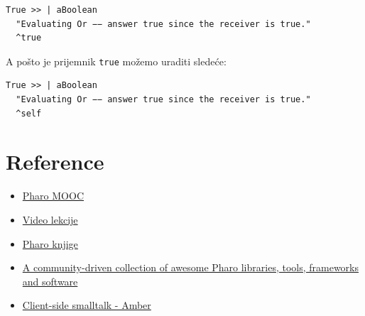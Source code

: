 \documentclass[presentation]{beamer}
\begin{document}
\begin{verbatim}
True >> | aBoolean
  "Evaluating Or −− answer true since the receiver is true."
  ^true
\end{verbatim}

A pošto je prijemnik \texttt{true} možemo uraditi sledeće:

\begin{verbatim}
True >> | aBoolean
  "Evaluating Or −− answer true since the receiver is true."
  ^self
\end{verbatim}

\section{Reference}
\label{sec:org6471919}

\begin{itemize}
\item \href{http://mooc.pharo.org}{Pharo MOOC}
\item \href{http://rmod-pharo-mooc.lille.inria.fr/MOOC/WebPortal/co/pharo.html}{Video lekcije}
\item \href{http://books.pharo.org}{Pharo knjige}
\item \href{https://github.com/pharo-open-documentation/awesome-pharo}{A community-driven collection of awesome Pharo libraries, tools, frameworks and software}
\item \href{http://amber-lang.net/}{Client-side smalltalk - Amber}
\end{itemize}
\end{document}
